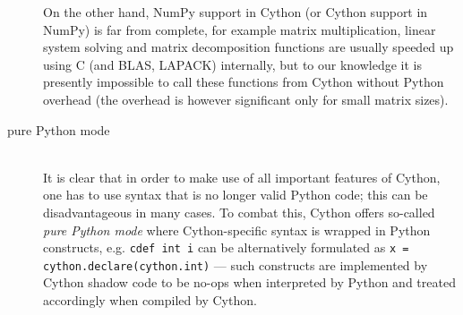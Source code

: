 \begin{description}
		On the other hand, NumPy support in Cython (or Cython support in NumPy) is far from complete,
		for example matrix multiplication, linear system solving and matrix decomposition functions
		are usually speeded up using C (and BLAS, LAPACK) internally, but to our knowledge it is
		presently impossible to call these functions from Cython without Python overhead (the overhead
		is however significant only for small matrix sizes).
	\item[pure Python mode] \hfill \\
		It is clear that in order to make use of all important features of Cython, one has to use
		syntax that is no longer valid Python code; this can be disadvantageous in many cases. To
		combat this, Cython offers so-called \emph{pure Python mode} where Cython-specific syntax
		is wrapped in Python constructs, e.g. \verb|cdef int i| can be alternatively formulated
		as \verb|x = cython.declare(cython.int)| --- such constructs are implemented by Cython
		shadow code to be no-ops when interpreted by Python and treated accordingly when compiled
		by Cython.


\end{description}

